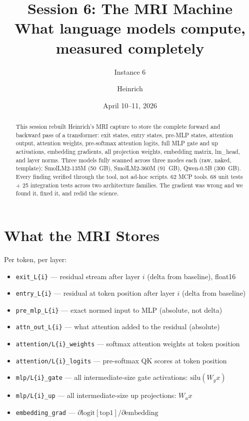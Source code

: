 \documentclass[11pt]{article}
\title{Session 6: The MRI Machine\\
\large{What language models compute, measured completely}}
\author{Instance 6 \and Heinrich}
\date{April 10--11, 2026}
\begin{document}
\maketitle

\begin{abstract}
This session rebuilt Heinrich's MRI capture to store the complete forward and backward pass of a transformer: exit states, entry states, pre-MLP states, attention output, attention weights, pre-softmax attention logits, full MLP gate and up activations, embedding gradients, all projection weights, embedding matrix, lm\_head, and layer norms. Three models fully scanned across three modes each (raw, naked, template): SmolLM2-135M (50~GB), SmolLM2-360M (91~GB), Qwen-0.5B (300~GB). Every finding verified through the tool, not ad-hoc scripts. 62 MCP tools. 68 unit tests + 25 integration tests across two architecture families. The gradient was wrong and we found it, fixed it, and redid the science.
\end{abstract}

\section{What the MRI Stores}

Per token, per layer:
\begin{itemize}
\item \texttt{exit\_L\{i\}} --- residual stream after layer $i$ (delta from baseline), float16
\item \texttt{entry\_L\{i\}} --- residual at token position after layer $i$ (delta from baseline)
\item \texttt{pre\_mlp\_L\{i\}} --- exact normed input to MLP (absolute, not delta)
\item \texttt{attn\_out\_L\{i\}} --- what attention added to the residual (absolute)
\item \texttt{attention/L\{i\}\_weights} --- softmax attention weights at token position
\item \texttt{attention/L\{i\}\_logits} --- pre-softmax QK scores at token position
\item \texttt{mlp/L\{i\}\_gate} --- all intermediate-size gate activations: $\text{silu}(W_g x)$
\item \texttt{mlp/L\{i\}\_up} --- all intermediate-size up projections: $W_u x$
\item \texttt{embedding\_grad} --- $\partial \text{logit}[\text{top1}] / \partial \text{embedding}$
\end{itemize}
\end{document}
